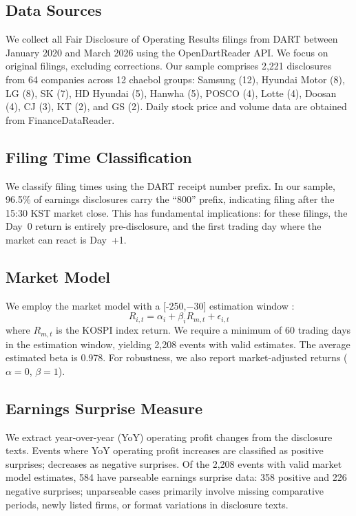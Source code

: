 \documentclass[manuscript,review]{acmart}
\begin{document}
\subsection{Data Sources}

We collect all Fair Disclosure of Operating Results filings from DART between January 2020 and March 2026 using the OpenDartReader API. We focus on original filings, excluding corrections. Our sample comprises 2,221 disclosures from 64 companies across 12 chaebol groups: Samsung (12), Hyundai Motor (8), LG (8), SK (7), HD Hyundai (5), Hanwha (5), POSCO (4), Lotte (4), Doosan (4), CJ (3), KT (2), and GS (2). Daily stock price and volume data are obtained from FinanceDataReader.

\subsection{Filing Time Classification}

We classify filing times using the DART receipt number prefix. In our sample, 96.5\% of earnings disclosures carry the ``800'' prefix, indicating filing after the 15:30 KST market close. This has fundamental implications: for these filings, the Day~0 return is entirely pre-disclosure, and the first trading day where the market can react is Day~+1.

\subsection{Market Model}

We employ the market model with a [-250,$-$30] estimation window \cite{mackinlay1997event}:
\begin{equation}
R_{i,t} = \alpha_i + \beta_i R_{m,t} + \epsilon_{i,t}
\end{equation}
where $R_{m,t}$ is the KOSPI index return. We require a minimum of 60 trading days in the estimation window, yielding 2,208 events with valid estimates. The average estimated beta is 0.978. For robustness, we also report market-adjusted returns ($\alpha=0$, $\beta=1$).

\subsection{Earnings Surprise Measure}

We extract year-over-year (YoY) operating profit changes from the disclosure texts. Events where YoY operating profit increases are classified as positive surprises; decreases as negative surprises. Of the 2,208 events with valid market model estimates, 584 have parseable earnings surprise data: 358 positive and 226 negative surprises; unparseable cases primarily involve missing comparative periods, newly listed firms, or format variations in disclosure texts.
\end{document}
